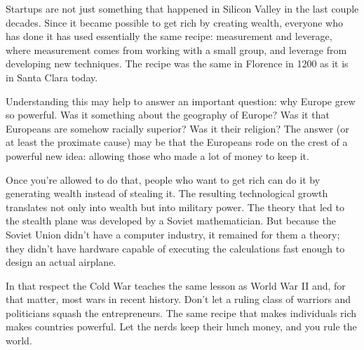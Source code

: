 Startups are not just something that happened in Silicon Valley in the
last couple decades. Since it became possible to get rich by creating
wealth, everyone who has done it has used essentially the same recipe:
measurement and leverage, where measurement comes from working with a
small group, and leverage from developing new techniques. The recipe was
the same in Florence in 1200 as it is in Santa Clara today.

Understanding this may help to answer an important question: why Europe
grew so powerful. Was it something about the geography of Europe? Was it
that Europeans are somehow racially superior? Was it their religion? The
answer (or at least the proximate cause) may be that the Europeans rode
on the crest of a powerful new idea: allowing those who made a lot of
money to keep it.

Once you're allowed to do that, people who want to get rich can do it by
generating wealth instead of stealing it. The resulting technological
growth translates not only into wealth but into military power. The
theory that led to the stealth plane was developed by a Soviet
mathematician. But because the Soviet Union didn't have a computer
industry, it remained for them a theory; they didn't have hardware
capable of executing the calculations fast enough to design an actual
airplane.

In that respect the Cold War teaches the same lesson as World War II
and, for that matter, most wars in recent history. Don't let a ruling
class of warriors and politicians squash the entrepreneurs. The same
recipe that makes individuals rich makes countries powerful. Let the
nerds keep their lunch money, and you rule the world.
